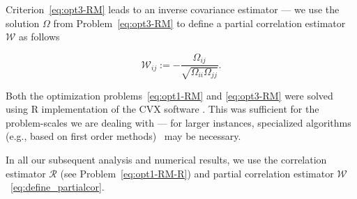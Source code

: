 Criterion~\eqref{eq:opt3-RM} leads to an inverse covariance estimator --- we use the solution $\Omega$ from Problem~\eqref{eq:opt3-RM} to define a partial correlation estimator $\mathcal{W}$ as follows 

\begin{equation}\label{eq:define_partialcor}
    \mathcal{W}_{ij} := -\frac{\Omega_{ij}}{\sqrt{\Omega_{ii} \Omega_{jj}}}.
\end{equation}

Both the optimization problems~\eqref{eq:opt1-RM} and \eqref{eq:opt3-RM} were solved using R implementation of the CVX software \cite{Boyd2004, Fu2017}. This was sufficient for the problem-scales we are dealing with --- for larger instances, specialized algorithms (e.g., based on first order methods)~\cite{hastie2015statistical,mazumder2012graphical,atchade2015scalable} may be necessary.

In all our subsequent analysis and numerical results, we use the \Robocov{} correlation estimator $\mathcal{R}$ (see Problem~\eqref{eq:opt1-RM-R}) and partial correlation estimator $\mathcal{W}$~\eqref{eq:define_partialcor}.





